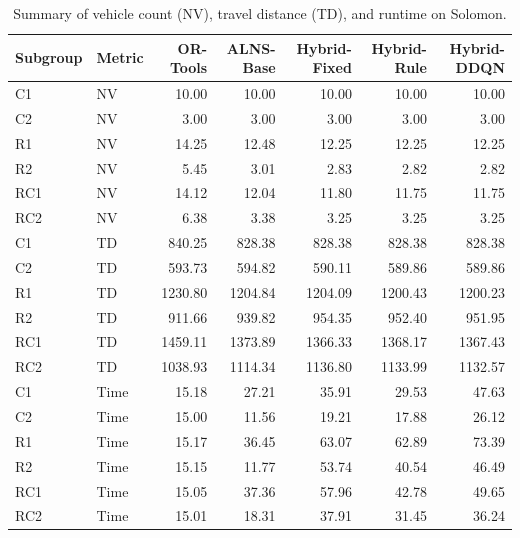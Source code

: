 
\begin{table}[htbp]
\centering
\caption{Summary of vehicle count (NV), travel distance (TD), and runtime on Solomon.}
\label{tab:results_solomon}
\begin{tabular}{llrrrrr}
\hline
\textbf{Subgroup} & \textbf{Metric} & \textbf{OR-Tools} & \textbf{ALNS-Base} & \textbf{Hybrid-Fixed} & \textbf{Hybrid-Rule} & \textbf{Hybrid-DDQN} \\ \hline
C1 & NV & 10.00 & 10.00 & 10.00 & 10.00 & 10.00 \\
C2 & NV & 3.00 & 3.00 & 3.00 & 3.00 & 3.00 \\
R1 & NV & 14.25 & 12.48 & 12.25 & 12.25 & 12.25 \\
R2 & NV & 5.45 & 3.01 & 2.83 & 2.82 & 2.82 \\
RC1 & NV & 14.12 & 12.04 & 11.80 & 11.75 & 11.75 \\
RC2 & NV & 6.38 & 3.38 & 3.25 & 3.25 & 3.25 \\
C1 & TD & 840.25 & 828.38 & 828.38 & 828.38 & 828.38 \\
C2 & TD & 593.73 & 594.82 & 590.11 & 589.86 & 589.86 \\
R1 & TD & 1230.80 & 1204.84 & 1204.09 & 1200.43 & 1200.23 \\
R2 & TD & 911.66 & 939.82 & 954.35 & 952.40 & 951.95 \\
RC1 & TD & 1459.11 & 1373.89 & 1366.33 & 1368.17 & 1367.43 \\
RC2 & TD & 1038.93 & 1114.34 & 1136.80 & 1133.99 & 1132.57 \\
C1 & Time & 15.18 & 27.21 & 35.91 & 29.53 & 47.63 \\
C2 & Time & 15.00 & 11.56 & 19.21 & 17.88 & 26.12 \\
R1 & Time & 15.17 & 36.45 & 63.07 & 62.89 & 73.39 \\
R2 & Time & 15.15 & 11.77 & 53.74 & 40.54 & 46.49 \\
RC1 & Time & 15.05 & 37.36 & 57.96 & 42.78 & 49.65 \\
RC2 & Time & 15.01 & 18.31 & 37.91 & 31.45 & 36.24 \\
\hline
\end{tabular}
\end{table}


